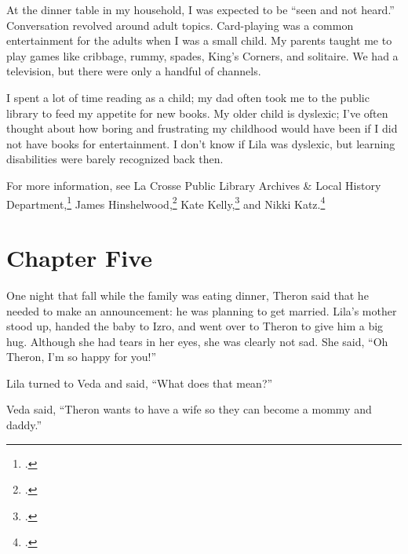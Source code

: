 \documentclass[
  american,
  letterpaper,
]{book}
\begin{document}
At the dinner table in my household, I was expected to be ``seen and not
heard.'' Conversation revolved around adult topics. Card-playing was a
common entertainment for the adults when I was a small child. My parents
taught me to play games like cribbage, rummy, spades, King's Corners,
and solitaire. We had a television, but there were only a handful of
channels.

I spent a lot of time reading as a child; my dad often took me to the
public library to feed my appetite for new books. My older child is
dyslexic; I've often thought about how boring and frustrating my
childhood would have been if I did not have books for entertainment. I
don't know if Lila was dyslexic, but learning disabilities were barely
recognized back then.

For more information, see La Crosse Public Library Archives \& Local
History Department,\footnote{.}
James Hinshelwood,\footnote{.} Kate
Kelly,\footnote{.}
and Nikki Katz.\footnote{.}


\chapter{Chapter Five}\label{chapter-five}

One night that fall while the family was eating dinner, Theron said that
he needed to make an announcement: he was planning to get married.
Lila's mother stood up, handed the baby to Izro, and went over to Theron
to give him a big hug. Although she had tears in her eyes, she was
clearly not sad. She said, ``Oh Theron, I'm so happy for you!''

Lila turned to Veda and said, ``What does that mean?''

Veda said, ``Theron wants to have a wife so they can become a mommy and
daddy.''
\end{document}
